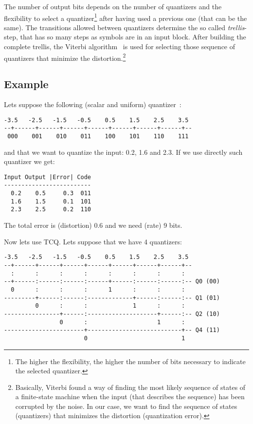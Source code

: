 The number of output bits depends on the number of quantizers and the
flexibility to select a quantizer\footnote{The higher the flexibility,
the higher the number of bits necessary to indicate the selected
quantizer.} after having used a previous one (that can be the
same). The transitions allowed between quantizers determine the so
called \emph{trellis}-step, that has so many steps as symbols are in
an input block. After building the complete trellis, the Viterbi
algorithm~\cite{} is used for selecting those sequence of quantizers
that minimize the distortion.\footnote{Basically, Viterbi found a way
of finding the most likely sequence of states of a finite-state
machine when the input (that describes the sequence) has been
corrupted by the noise. In our case, we want to find the sequence of
states (quantizers) that minimizes the distortion (quantization
error).}

\subsection*{Example}
Lets suppose the following (scalar and uniform) quantizer~\cite{}:

\begin{verbatim}
-3.5   -2.5   -1.5   -0.5    0.5    1.5    2.5    3.5
--+------+------+------+------+------+------+------+--
 000    001    010    011    100    101    110    111
\end{verbatim}

and that we want to quantize the input: 0.2, 1.6 and 2.3. If we use
directly such quantizer we get:

\begin{verbatim}
Input Output |Error| Code
-------------------------
  0.2    0.5     0.3  011
  1.6    1.5     0.1  101
  2.3    2.5     0.2  110
\end{verbatim}

The total error is (distortion) 0.6 and we need (rate) 9 bits.

Now lets use TCQ. Lets suppose that we have 4 quantizers:

\begin{verbatim}
-3.5   -2.5   -1.5   -0.5    0.5    1.5    2.5    3.5
--+------+------+------+------+------+------+------+--
  :      :      :      :      :      :      :      :
--+------:------:------:------+------:------:------:-- Q0 (00)
  0      :      :      :      1      :      :      :
---------+------:------:-------------+------:------:-- Q1 (01)
         0      :      :             1      :      :
----------------+------:--------------------+------:-- Q2 (10)
                0      :                    1      :
-----------------------+---------------------------+-- Q4 (11)
                       0                           1                 
\end{verbatim}
 

